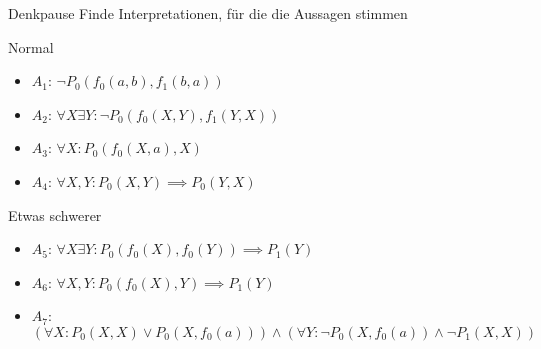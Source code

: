 {
\begin{frame}{Denkpause}
	Finde Interpretationen, für die die Aussagen stimmen
	\begin{block}{Normal}
		\begin{itemize}
			\item $A_1$: $\lnot P_0(f_0(a,b), f_1(b,a))$
			\item $A_2$: $\forall X \exists Y: \lnot P_0(f_0(X,Y), f_1(Y,X))$
			\item $A_3$: $\forall X: P_0(f_0(X,a),X)$
			\item $A_4$: $\forall X,Y: P_0(X,Y) \implies P_0(Y,X)$
		\end{itemize}
	\end{block}

	\begin{block}{Etwas schwerer}
		\begin{itemize}
			\item $A_5$: $\forall X \exists Y: P_0(f_0(X), f_0(Y)) \implies P_1(Y)$
			\item $A_6$: $\forall X, Y: P_0(f_0(X), Y) \implies P_1(Y)$
			\item $A_7$: $\left(\forall X : P_0(X,X) \lor P_0(X,f_0(a))\right) \land \left(\forall Y : \lnot P_0(X,f_0(a)) \land \lnot P_1(X,X) \right)$
		\end{itemize}
	\end{block}
\end{frame}

}

